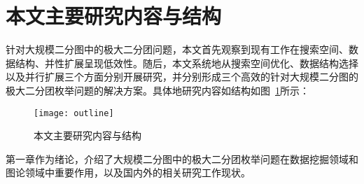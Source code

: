 

\section{本文主要研究内容与结构}

针对大规模二分图中的极大二分团问题，本文首先观察到现有工作在搜索空间、数据结构、并性扩展呈现低效性。随后，本文系统地从搜索空间优化、数据结构选择以及并行扩展三个方面分别开展研究，并分别形成三个高效的针对大规模二分图的极大二分团枚举问题的解决方案。具体地研究内容如结构如图~\ref{fig:outline}所示：

\begin{figure} [ht]
  \vspace{0.1 in}
  \centering
  \texttt{[image: outline]}
  \caption{本文主要研究内容与结构}
  \label{fig:outline}
\end{figure}

第一章作为绪论，介绍了大规模二分图中的极大二分团枚举问题在数据挖掘领域和图论领域中重要作用，以及国内外的相关研究工作现状。


